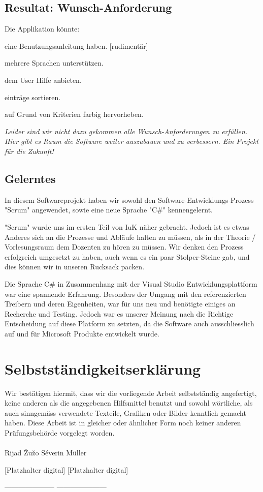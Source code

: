 \documentclass{article}
\begin{document}
\subsection{Resultat: Wunsch-Anforderung}
Die Applikation könnte:
\begin{description}
	\color{black}\item[W1:] eine Benutzungsanleitung haben. \color{green} {} \color{black}[rudimentär]
	\color{black}\item[W2:] mehrere Sprachen unterstützen.  \color{red}
	\color{black}\item[W3:] dem User Hilfe anbieten. \color{red}
	\color{black}\item[W4:] einträge sortieren. \color{red}
	\color{black}\item[W5:] auf Grund von Kriterien farbig hervorheben. \color{red}
\end{description}
\vspace{5mm}
\textit{Leider sind wir nicht dazu gekommen alle Wunsch-Anforderungen zu erfüllen. Hier gibt es Raum die Software weiter auszubauen und zu verbessern. Ein Projekt für die Zukunft!}
\subsection{Gelerntes}

In diesem Softwareprojekt haben wir sowohl den Software-Entwicklungs-Prozess "Scrum" angewendet, sowie eine neue Sprache "C\#" kennengelernt.

"Scrum" wurde uns im ersten Teil von IuK näher gebracht. Jedoch ist es etwas Anderes sich an die Prozesse und Abläufe halten zu müssen, als in der Theorie / Vorlesungsraum dem Dozenten zu hören zu müssen. Wir denken den Prozess erfolgreich umgesetzt zu haben, auch wenn es ein paar Stolper-Steine gab, und dies können wir in unseren Rucksack packen.

Die Sprache C\# in Zusammenhang mit der Visual Studio Entwicklungsplattform war eine spannende Erfahrung. Besonders der Umgang mit den referenzierten Treibern und deren Eigenheiten, war für uns neu und benötigte einiges an Recherche und Testing. Jedoch war es unserer Meinung nach die Richtige Entscheidung auf diese Platform zu setzten, da die Software auch ausschliesslich auf und für Microsoft Produkte entwickelt wurde.

\section{Selbstständigkeitserklärung}
Wir bestätigen hiermit, dass wir die vorliegende Arbeit selbstständig angefertigt,
keine anderen als die angegebenen Hilfsmittel benutzt und sowohl wörtliche, als auch sinngemäss
verwendete Texteile, Grafiken oder Bilder kenntlich gemacht haben.
Diese Arbeit ist in gleicher oder ähnlicher Form noch keiner anderen Prüfungsbehörde vorgelegt
worden. 
\\
\\

\centering
Rijad \v{Z}u\v{z}o \hspace{80mm}Séverin Müller


\vspace{15mm}

[Platzhalter digital] \hspace{70mm} [Platzhalter digital]

--------------------- \hspace{73mm}---------------------
\end{document}
